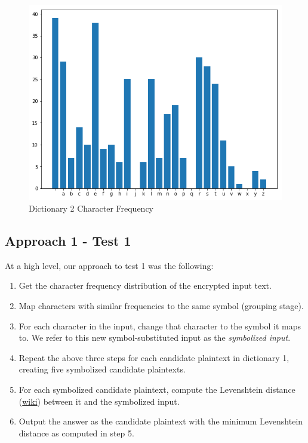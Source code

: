 \documentclass[12pt]{article}
\begin{document}
\begin{figure}[H]
    \centering
    \includegraphics[scale=0.5]{dict2.png}
    \caption{Dictionary 2 Character Frequency}
    \label{fig:dict2}
\end{figure}


\subsection{Approach 1 - Test 1}
At a high level, our approach to test 1 was the following:
\begin{enumerate}

    \item Get the character frequency distribution of the encrypted input text.
    \item Map characters with similar frequencies to the same symbol (grouping stage).
    \item For each character in the input, change that character to the symbol it maps to. We refer to this new symbol-substituted input as the \emph{symbolized input}.
    \item Repeat the above three steps for each candidate plaintext in dictionary 1, creating five symbolized candidate plaintexts.
    \item For each symbolized candidate plaintext, compute the Levenshtein distance (\href{https://en.wikipedia.org/wiki/Levenshtein_distance}{wiki}) between it and the symbolized input.
    \item Output the answer as the candidate plaintext with the minimum Levenshtein distance as computed in step 5.

\end{enumerate}
\end{document}

